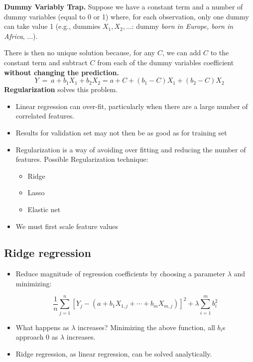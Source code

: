 \textbf{Dummy Variably Trap.} Suppose we have a constant term and a number of dummy variables (equal to 0 or 1) where, for each observation, only one dummy can take value 1 (e.g., dummies $X_{1} ,X_{2} ,\dotsc $: dummy \textit{born in Europe, born in Africa}, ...).

There is then no unique solution because, for any $C$, we can add $C$ to the constant term and subtract $C$ from each of the dummy variables coefficient \textbf{without changing the prediction.}
\begin{equation*}
    Y\ =\ a+b_{1} X_{1} +b_{2} X_{2} =a+C+( b_{1} -C) X_{1} +( b_{2} -C) X_{2}
\end{equation*}
\textbf{Regularization} solves this problem.
\begin{itemize}
    \item Linear regression can over-fit, particularly when there are a large number of correlated features.
    \item Results for validation set may not then be as good as for training set
    \item Regularization is a way of avoiding over fitting and reducing the number of features. Possible Regularization technique:
          \begin{itemize}
              \item Ridge 
              \item Lasso
              \item Elastic net
          \end{itemize}
    \item We must first scale feature values
\end{itemize}

\subsection{Ridge regression}

\begin{itemize}
    \item Reduce magnitude of regression coefficients by choosing a parameter $\lambda $ and minimizing:
          
          \begin{equation*}
              \frac{1}{n}\sum\limits _{j=1}^{n}\left[ Y_{j} -\left( a+b_{1} X_{1,j} +\cdots +b_{m} X_{m,j}\right)\right]^{2} +\lambda \sum _{i=1}^{m} b_{i}^{2}
          \end{equation*}
    \item What happens as $\lambda $ increases? Minimizing the above function, all $b_{i}$s approach 0 as $\lambda $ increases.
    \item Ridge regression, as linear regression, can be solved analytically.
\end{itemize}

